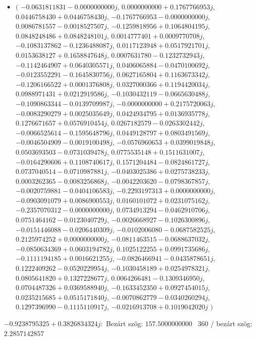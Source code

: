 \documentclass[14pt,a4paper]{article}
\begin{document}
\begin{itemize}
\item
$\big($
$-0.0631811831-0.0000000000j$, $0.0000000000+0.1767766953j$, $0.0446758430+0.0446758430j$, $-0.1767766953-0.0000000000j$, $0.0086781557-0.0018527507j$, $-0.1259818956+0.1064804195j$, $0.0848248486+0.0848248101j$, $0.0014777401+0.0009770708j$, $-0.1083137862-0.1236488087j$, $0.0117123948+0.0517921701j$, $0.0153638127+0.1658847648j$, $0.0007631780-0.1232732943j$, $-0.1142464907+0.0640305571j$, $0.0406065884-0.0470100692j$, $-0.0123552291-0.1645830756j$, $0.0627165804+0.1163673342j$, $-0.1206166522+0.0001376808j$, $0.0327000366+0.1194420034j$, $0.0988971431+0.0212919586j$, $-0.1030432119-0.0665630488j$, $-0.1090863344-0.0139709987j$, $-0.0000000000+0.2175720063j$, $-0.0083290279+0.0025035649j$, $0.0424934795+0.0136935778j$, $0.1276671657+0.0576910454j$, $0.0267182579-0.0263302442j$, $-0.0066525614-0.1595648796j$, $0.0449128797+0.0803491569j$, $-0.0046504909-0.0019100498j$, $-0.0576960653+0.0399019848j$, $0.0503693503-0.0731039478j$, $0.0775535148+0.1511631007j$, $-0.0164290606+0.1108740617j$, $0.1571204484-0.0824861727j$, $0.0737040514-0.0710987881j$, $-0.0403025386+0.0275738233j$, $0.0003262365-0.0083256868j$, $-0.0042203620-0.0798367857j$, $-0.0020759881-0.0404106583j$, $-0.2293197313+0.0000000000j$, $-0.0903091079+0.0086900553j$, $0.0160101072+0.0231075162j$, $-0.2357070312-0.0000000000j$, $0.0734913294-0.0462910706j$, $0.0751464162-0.0123040729j$, $-0.0026668927-0.1026300896j$, $-0.0151446088-0.0206440309j$, $-0.0102006080-0.0687582525j$, $0.2125974252+0.0000000000j$, $-0.0811463515-0.0688637032j$, $-0.0850634369+0.0603194782j$, $0.1025122255+0.0991735686j$, $-0.1111194185+0.0016621255j$, $-0.0826466941-0.0435878651j$, $0.1222409262-0.0520229954j$, $-0.1030458189+0.0254978321j$, $0.0805641820+0.1327228677j$, $0.0064266481-0.1309346950j$, $0.0704487326+0.0369588940j$, $-0.1633452350+0.0927454015j$, $0.0235215685+0.0515171840j$, $-0.0070862779-0.0340260294j$, $0.1297396990-0.1115110917j$, $-0.0216913708+0.1019042020j$
$\big)$
\end{itemize}
$-0.9238795325+0.3826834324j$:\
Bezárt szög: $157.5000000000$ \
360 / bezárt szög: $2.2857142857$\
\end{document}
